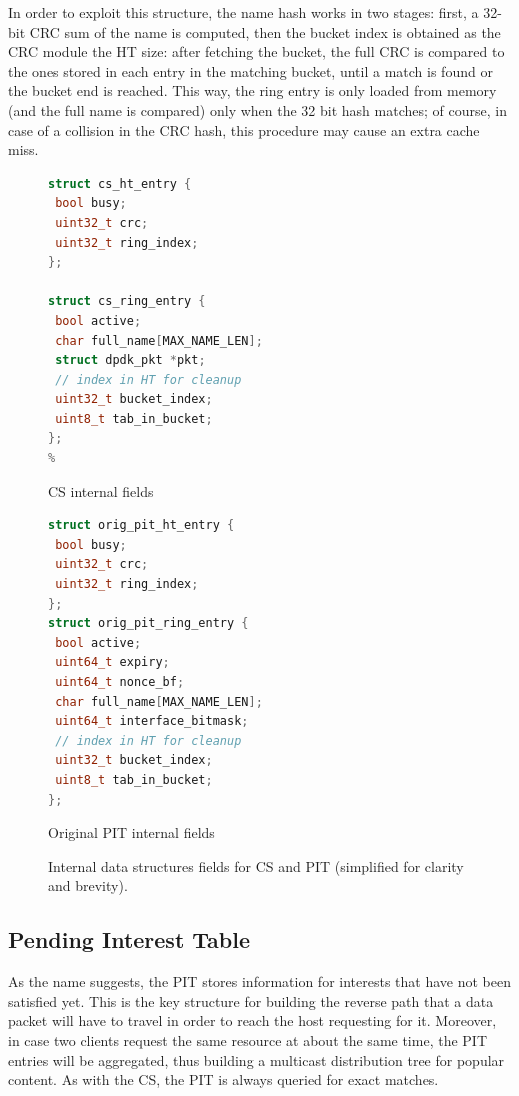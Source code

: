 \documentclass[11pt,a4paper,twoside,titlepage,openany]{book}
\begin{document}
In order to exploit this structure, the name hash works in two stages: first, a 32-bit \gls{CRC} sum of the name is computed, then the bucket index is obtained as the CRC module the HT size: after fetching the bucket, the full \gls{CRC} is compared to the ones stored in each entry in the matching bucket, until a match is found or the bucket end is reached. This way, the ring entry is only loaded from memory (and the full name is compared) only when the 32 bit hash matches; of course, in case of a collision in the CRC hash, this procedure may cause an extra cache miss.

\begin{figure}[htb]
  \captionsetup{type=lstlisting}
  \begin{sublstlisting}[t]{.5\linewidth}
  \begin{lstlisting}[language=c,escapechar=\%]
struct cs_ht_entry {
 bool busy;
 uint32_t crc;
 uint32_t ring_index;
};

struct cs_ring_entry {
 bool active;
 char full_name[MAX_NAME_LEN];
 struct dpdk_pkt *pkt;
 // index in HT for cleanup
 uint32_t bucket_index;
 uint8_t tab_in_bucket;
};
%
    \end{lstlisting}
    \caption{CS internal fields}\label{lst:augustus.cs}
  \end{sublstlisting}%
  \begin{sublstlisting}[t]{.5\linewidth}
  \begin{lstlisting}[language=c]
struct orig_pit_ht_entry {
 bool busy;
 uint32_t crc;
 uint32_t ring_index;
};
struct orig_pit_ring_entry {
 bool active;
 uint64_t expiry;
 uint64_t nonce_bf;
 char full_name[MAX_NAME_LEN];
 uint64_t interface_bitmask;
 // index in HT for cleanup
 uint32_t bucket_index;
 uint8_t tab_in_bucket;
};
    \end{lstlisting}
    \caption{Original PIT internal fields}\label{lst:augustus.oldpit}
  \end{sublstlisting}
  \caption[CS and original PIT internal data structures fields]{Internal data structures fields for CS and PIT (simplified for clarity and brevity).}\label{lst:augustus.cs_oldpit}
\end{figure}

\subsection{Pending Interest Table}\label{sec:augustus.pit}
As the name suggests, the \gls{PIT} stores information for interests that have not been satisfied yet. This is the key structure for building the reverse path that a data packet will have to travel in order to reach the host requesting for it. Moreover, in case two clients request the same resource at about the same time, the PIT entries will be aggregated, thus building a multicast distribution tree for popular content.
As with the \gls{CS}, the PIT is always queried for exact matches.
\end{document}
